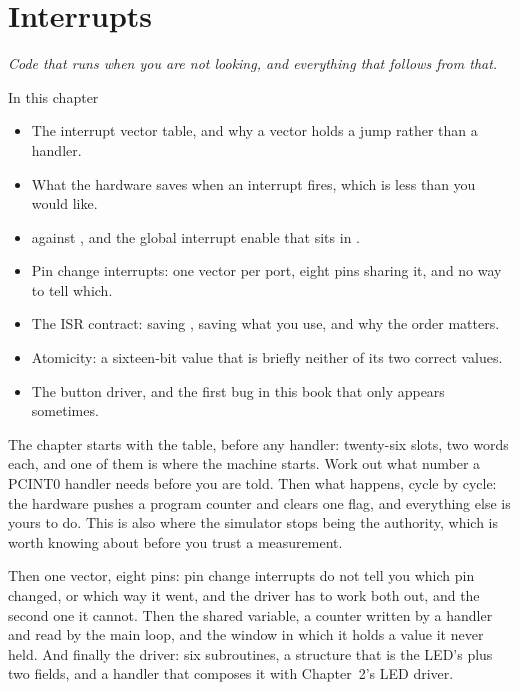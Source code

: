 
\chapter{Interrupts}
\label{c3:ch:interrupts}

{\large\itshape Code that runs when you are not looking, and everything that follows from
that.\par}

\begin{chapterbox}{In this chapter}
\begin{itemize}
  \item The interrupt vector table, and why a vector holds a jump rather than a handler.
  \item What the hardware saves when an interrupt fires, which is less than you would like.
  \item {} against , and the global interrupt enable that sits in
    .
  \item Pin change interrupts: one vector per port, eight pins sharing it, and no way to tell
    which.
  \item The ISR contract: saving , saving what you use, and why the order matters.
  \item Atomicity: a sixteen-bit value that is briefly neither of its two correct values.
  \item The button driver, and the first bug in this book that only appears sometimes.
\end{itemize}
\end{chapterbox}

The chapter starts with the table, before any handler: twenty-six slots, two words each, and one
of them is where the machine starts. Work out what  number a PCINT0 handler needs
before you are told. Then what happens, cycle by cycle: the hardware pushes a program counter and
clears one flag, and everything else is yours to do. This is also where the simulator stops being
the authority, which is worth knowing about before you trust a measurement.

Then one vector, eight pins: pin change interrupts do not tell you which pin changed, or which way
it went, and the driver has to work both out, and the second one it cannot. Then the shared
variable, a counter written by a handler and read by the main loop, and the window in which it
holds a value it never held. And finally the driver: six subroutines, a structure that is the
LED's plus two fields, and a handler that composes it with Chapter~2's LED driver.

